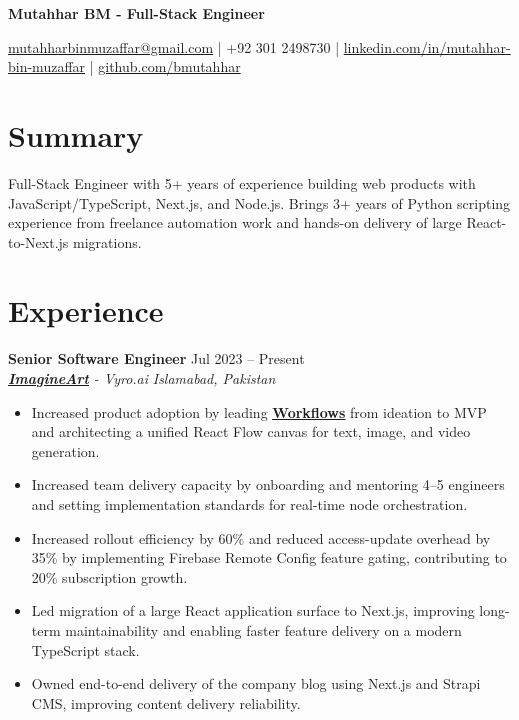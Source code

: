 \documentclass[9pt,letterpaper]{article}
\newcommand{\resumeHeader}[1]{%
  \begin{center}
    \vspace{1pt}
    {\fontsize{17pt}{19pt}\selectfont\bfseries #1\par}
    \vspace{3pt}
  \end{center}
}
\newcommand{\role}[4]{\textbf{#1} \hfill #2 \\
\textit{#3} \hfill \textit{#4}\\[-5pt]}
\begin{document}
\resumeHeader{Mutahhar BM - Full-Stack Engineer}
\begin{center}
\fontsize{9pt}{11pt}\selectfont
\href{mailto:mutahharbinmuzaffar@gmail.com}{mutahharbinmuzaffar@gmail.com} \;|\; +92 301 2498730 \;|\;
\href{https://www.linkedin.com/in/mutahhar-bin-muzaffar}{linkedin.com/in/mutahhar-bin-muzaffar} \;|\;
\href{https://github.com/bmutahhar}{github.com/bmutahhar}
\end{center}

\section*{Summary}
Full-Stack Engineer with 5+ years of experience building web products with JavaScript/TypeScript, Next.js, and Node.js. Brings 3+ years of Python scripting experience from freelance automation work and hands-on delivery of large React-to-Next.js migrations.

\section*{Experience}
\role{Senior Software Engineer}{Jul 2023 -- Present}{\href{https://www.imagine.art/}{\textbf{\underline{ImagineArt}}} - Vyro.ai}{Islamabad, Pakistan}
\begin{itemize}[leftmargin=*, itemsep=0pt, topsep=0pt, partopsep=0pt, parsep=0pt, after=\vspace{1pt}]
  \item Increased product adoption by leading \href{https://www.imagine.art/flow}{\textbf{\underline{Workflows}}} from ideation to MVP and architecting a unified React Flow canvas for text, image, and video generation.
  \item Increased team delivery capacity by onboarding and mentoring 4--5 engineers and setting implementation standards for real-time node orchestration.
  \item Increased rollout efficiency by 60\% and reduced access-update overhead by 35\% by implementing Firebase Remote Config feature gating, contributing to 20\% subscription growth.
  \item Led migration of a large React application surface to Next.js, improving long-term maintainability and enabling faster feature delivery on a modern TypeScript stack.
  \item Owned end-to-end delivery of the company blog using Next.js and Strapi CMS, improving content delivery reliability.

\end{itemize}
\end{document}
